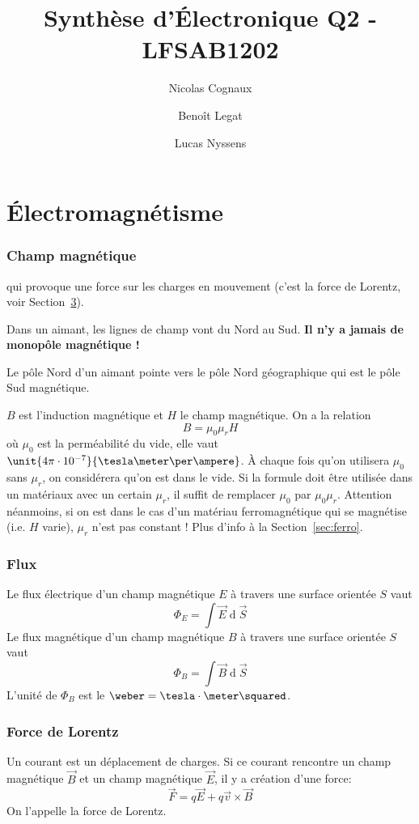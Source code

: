 \documentclass[11pt,a4paper]{article}
\title{Synthèse d'Électronique Q2 - LFSAB1202}
\author{Nicolas Cognaux \and Benoît Legat \and Lucas Nyssens}
\newcommand{\B}{\vec B}
\newcommand{\E}{\vec E}
\DeclareMathOperator{\diff}{d}
\newcommand{\dif}{\diff\!}
\begin{document}
\maketitle

\part{Électromagnétisme}

\section{Champ magnétique}
qui provoque une force sur les charges en mouvement (c'est la force de Lorentz, voir Section~\ref{sec:lorentz}).

Dans un aimant, les lignes de champ vont du Nord au Sud.
{\bf Il n'y a jamais de monopôle magnétique !}

Le pôle Nord d'un aimant pointe vers le pôle Nord géographique qui est le pôle Sud magnétique.

$B$ est l'induction magnétique et $H$ le champ magnétique.
On a la relation
\[ B = \mu_0\mu_rH \]
où $\mu_0$ est la perméabilité du vide, elle vaut $\unit{4\pi \cdot 10^{-7}}{\tesla\meter\per\ampere}$.
À chaque fois qu'on utilisera $\mu_0$ sans $\mu_r$, on considérera qu'on est dans le vide.
Si la formule doit être utilisée dans un matériaux avec un certain $\mu_r$,
il suffit de remplacer $\mu_0$ par $\mu_0\mu_r$.
Attention néanmoins, si on est dans le cas d'un matériau ferromagnétique qui se magnétise (i.e. $H$ varie), $\mu_r$ n'est pas constant !
Plus d'info à la Section~\ref{sec:ferro}.

\section{Flux}
Le flux électrique d'un champ magnétique $E$ à travers une surface orientée $S$ vaut
\[ \Phi_E = \int \E \dif \vec S \]
Le flux magnétique d'un champ magnétique $B$ à travers une surface orientée $S$ vaut
\[ \Phi_B = \int \B \dif \vec S \]
L'unité de $\Phi_B$ est le $\weber = \tesla \cdot \meter \squared$.

\section{Force de Lorentz}
\label{sec:lorentz}
Un courant est un déplacement de charges.
Si ce courant rencontre un champ magnétique $\B$ et un champ magnétique $\E$, il y a création d'une force:
$$ \vec F = q \E + q \vec v \times \B $$
On l'appelle la force de Lorentz.
\end{document}
